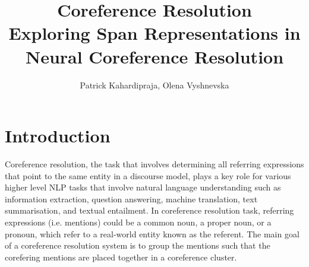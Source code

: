 \documentclass[11pt]{article}
\title{{\LARGE Coreference Resolution}\\[1.5mm]
{\large Exploring Span Representations in Neural Coreference Resolution}\\[1.5mm]} %
\author{Patrick Kahardipraja, Olena Vyshnevska}%
\date{} %
\begin{document}
\maketitle


\section{Introduction}










Coreference resolution, the task that involves determining all referring expressions that point to the same entity in a discourse model, plays a key role for various higher level NLP tasks that involve natural language understanding such as information extraction, question answering, machine translation, text summarisation, and textual entailment. In coreference resolution task, referring expressions (i.e. mentions) could be a common noun, a proper noun, or a pronoun, which refer to a real-world entity known as the referent. The main goal of a coreference resolution system is to group the mentions such that the corefering mentions are placed together in a coreference cluster.
\end{document}
